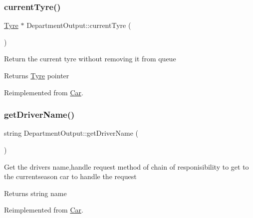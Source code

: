 \mbox{\label{classDepartmentOutput_aca95508fd9145baea4e7a32448fa653b}} 
\subsubsection{\texorpdfstring{current\+Tyre()}{currentTyre()}}
{\footnotesize\ttfamily \hyperlink{classTyre}{Tyre} $\ast$ Department\+Output\+::current\+Tyre (\begin{DoxyParamCaption}{ }\end{DoxyParamCaption})\hspace{0.3cm}{\ttfamily [virtual]}}

Return the current tyre without removing it from queue \begin{DoxyReturn}{Returns}
\hyperlink{classTyre}{Tyre} pointer 
\end{DoxyReturn}


Reimplemented from \hyperlink{classCar_aadd6f69cf389b293a5e8a098ebc75f1d}{Car}.

\mbox{\label{classDepartmentOutput_a5c2bbaa1979ecbbd06629440884966a0}} 
\subsubsection{\texorpdfstring{get\+Driver\+Name()}{getDriverName()}}
{\footnotesize\ttfamily string Department\+Output\+::get\+Driver\+Name (\begin{DoxyParamCaption}{ }\end{DoxyParamCaption})\hspace{0.3cm}{\ttfamily [virtual]}}

Get the drivers name,handle request method of chain of responisibility to get to the currentseason car to handle the request \begin{DoxyReturn}{Returns}
string name 
\end{DoxyReturn}


Reimplemented from \hyperlink{classCar_a0192991111c42f7cba809cc9831cd5f3}{Car}.

\mbox{\label{classDepartmentOutput_ab12d572677cc6c3a4b32cc1c5894f54e}} 

